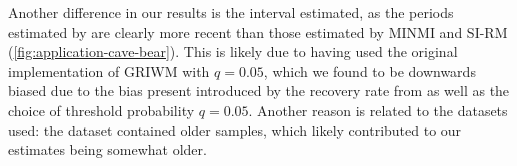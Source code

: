 Another difference in our results is the interval estimated, as the periods estimated by \citet{Baca2016} are clearly more recent than those estimated by MINMI and SI-RM (\autoref{fig:application-cave-bear}). This is likely due to \citet{Baca2016} having used the original implementation of GRIWM with $q = 0.05$, which we found to be downwards biased due to the bias present introduced by the recovery rate from \citet{Mcinerny2006} as well as the choice of threshold probability $q=0.05$. Another reason is related to the datasets used: the \citet{Cooper2015} dataset contained older samples, which likely contributed to our estimates being somewhat older.